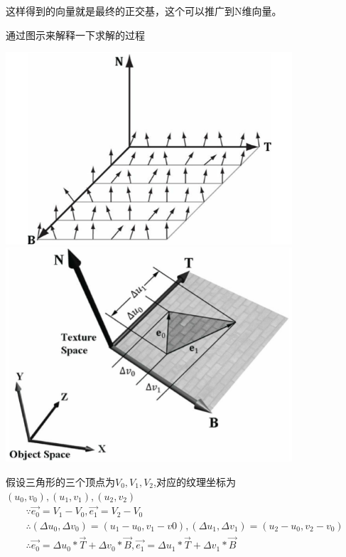 这样得到的向量就是最终的正交基，这个可以推广到N维向量。
\par
通过图示来解释一下求解的过程
\begin{center}
    \includegraphics[width=0.8\textwidth]{images/normal_map_tnb.png}
    \includegraphics[width=0.8\textwidth]{images/normal_map_tnb_in_object_space.png}
\end{center}
假设三角形的三个顶点为$V_{0},V_{1},V_{2}$,对应的纹理坐标为$(u_{0},v_{0}),(u_{1},v_{1}),(u_{2},v_{2})$
\begin{gather*}
    \because \overrightarrow{e_{0}} = V_{1} - V_{0}, \overrightarrow{e_{1}} = V_{2} - V_{0} \\ 
    \therefore (\Delta u_{0},\Delta v_{0}) = (u_{1} - u_{0}, v_{1} - v{0}),
    (\Delta u_{1}, \Delta v_{1}) = (u_{2} - u_{0}, v_{2} - v_{0}) \\ 
    \therefore \overrightarrow{e_{0}} = \Delta u_{0} \ast \overrightarrow{T} + \Delta v_{0} \ast \overrightarrow{B}, 
    \overrightarrow{e_{1}} = \Delta u_{1} \ast \overrightarrow{T} + \Delta v_{1} \ast \overrightarrow{B} \\    
\end{gather*}

